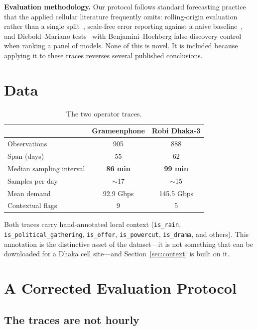 \documentclass[conference]{IEEEtran}
\begin{document}
\textbf{Evaluation methodology.} Our protocol follows standard forecasting practice
that the applied cellular literature frequently omits: rolling-origin evaluation rather
than a single split~\cite{tashman2000outofsample}, scale-free error reporting against a
naive baseline~\cite{hyndman2006another}, and Diebold--Mariano
tests~\cite{diebold1995comparing} with Benjamini--Hochberg false-discovery
control~\cite{benjamini1995controlling} when ranking a panel of models. None of this is
novel. It is included because applying it to these traces reverses several published
conclusions.

\section{Data}

\begin{table}[htbp]
\caption{The two operator traces.}
\label{tab:data}
\centering
\begin{tabular}{lcc}
\toprule
& \textbf{Grameenphone} & \textbf{Robi Dhaka-3} \\
\midrule
Observations & 905 & 888 \\
Span (days) & 55 & 62 \\
Median sampling interval & \textbf{86 min} & \textbf{99 min} \\
Samples per day & $\sim$17 & $\sim$15 \\
Mean demand & 92.9 Gbps & 145.5 Gbps \\
Contextual flags & 9 & 5 \\
\bottomrule
\end{tabular}
\end{table}

Both traces carry hand-annotated local context (\texttt{is\_rain},
\texttt{is\_political\_gathering}, \texttt{is\_offer}, \texttt{is\_powercut},
\texttt{is\_drama}, and others). This annotation is the distinctive asset of the
dataset---it is not something that can be downloaded for a Dhaka cell site---and
Section~\ref{sec:context} is built on it.

\section{A Corrected Evaluation Protocol}
\label{sec:protocol}

\subsection{The traces are not hourly}
\label{sec:nothourly}
\end{document}
